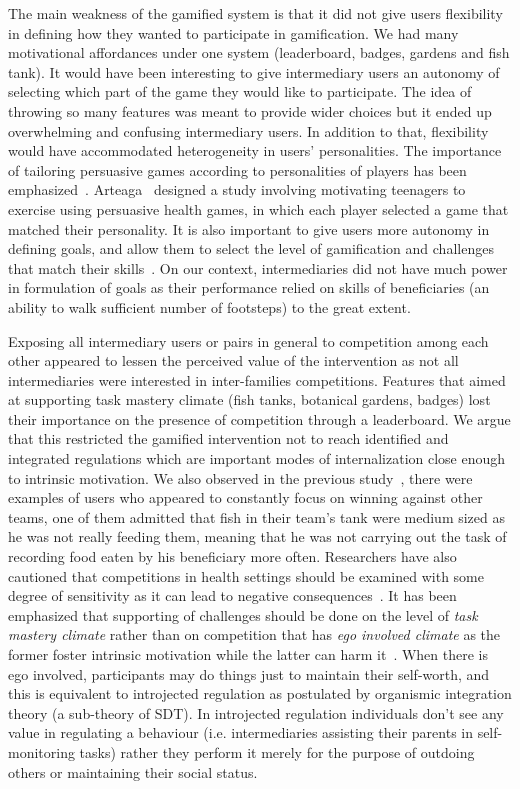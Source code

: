 \documentclass{sig-alternate}
\begin{document}
The main weakness of the gamified system is that it did not give users flexibility in defining how they wanted to participate in gamification. We had many motivational affordances under one system (leaderboard, badges, gardens and fish tank). It would have been interesting to give intermediary users an autonomy of selecting which part of the game they would like to participate. The idea of throwing so many features was meant to provide wider choices but it ended up overwhelming and confusing intermediary users. In addition to that, flexibility would have accommodated heterogeneity in users' personalities. The importance of tailoring persuasive games according to personalities of players has been emphasized~\cite{orji2013:tailoring}. Arteaga~\cite{arteaga2010:persuasive} designed a study involving motivating teenagers to exercise using persuasive health games, in which each player selected a game that matched their personality. It is also important to give users more autonomy in defining goals, and allow them to select the level of gamification and challenges that match their skills~\cite{zhang2008:motivational}. On our context, intermediaries did not have much power in formulation of goals as their performance relied on skills of beneficiaries (an ability to walk sufficient number of footsteps) to the great extent.

Exposing all intermediary users or pairs in general to competition among each other appeared to lessen the perceived value of the intervention as not all intermediaries were interested in inter-families competitions. Features that aimed at supporting task mastery climate (fish tanks, botanical gardens, badges) lost their importance on the presence of competition through a leaderboard. We argue that this restricted the gamified intervention not to reach identified and integrated regulations which are important modes of internalization close enough to intrinsic motivation. We also observed in the previous study~\cite{katule2016:leveraging},  there were examples of users who appeared to constantly focus on winning against other teams, one of them admitted that fish in their team's tank were medium sized as he was not really feeding them, meaning that he was not carrying out the task of recording food eaten by his beneficiary more often. Researchers have also cautioned that competitions in health settings should be examined with some degree of sensitivity as it can lead to negative consequences~\cite{grimes2009toward}. It has been emphasized that supporting of  challenges should be done on the level of \emph{task mastery climate} rather than on competition that has \emph{ego involved climate} as the  former foster intrinsic motivation while the latter can harm it~\cite{saksono2015spaceship}. When there is ego involved, participants may do things just to maintain their self-worth, and this is equivalent to introjected regulation as postulated by organismic integration theory (a sub-theory of SDT)\cite{ryan2000:self}. In introjected regulation individuals don't see any value in regulating a behaviour (i.e. intermediaries assisting their parents in self-monitoring tasks) rather they perform it merely for the purpose of outdoing others or maintaining their social status. 
\end{document}
